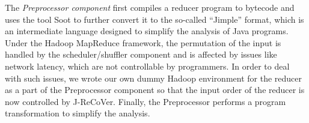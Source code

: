 \documentclass{llncs}
\begin{document}
The \emph{Preprocessor component} first compiles a reducer program to bytecode
and uses the tool Soot to further convert it to the so-called ``Jimple'' format,
which is an intermediate language designed to simplify the analysis of Java
programs. Under the Hadoop MapReduce framework, the permutation of the input is
handled by the scheduler/shuffler component and is affected by issues like
network latency, which are not controllable by programmers. In order to deal
with such issues, we wrote our own dummy Hadoop environment for the reducer as a
part of the Preprocessor component so that the input order of the reducer is now
controlled by J-ReCoVer. Finally, the Preprocessor performs  a program transformation to simplify the analysis. 

\end{document}
